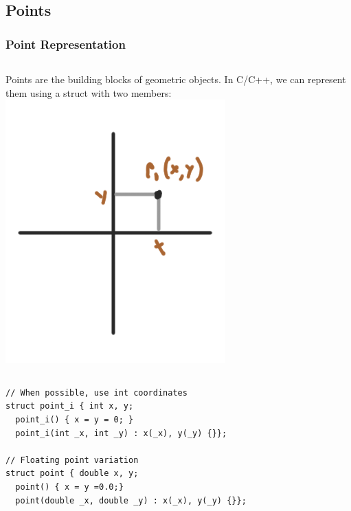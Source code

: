 \documentclass{beamer}
\begin{document}
\subsection{Points}
\begin{frame}
  \frametitle{Point Representation}  
  {\smaller

    \begin{columns}
      Points are the building blocks of geometric objects.
      In C/C++, we can represent them using a struct with two members:
      \includegraphics[width=.65\textwidth]{../img/geom2}
    \end{columns}

    \begin{exampleblock}{}
\begin{verbatim}
// When possible, use int coordinates
struct point_i { int x, y;
  point_i() { x = y = 0; }
  point_i(int _x, int _y) : x(_x), y(_y) {}};

// Floating point variation
struct point { double x, y;
  point() { x = y =0.0;}
  point(double _x, double _y) : x(_x), y(_y) {}};
\end{verbatim}
    \end{exampleblock}
  }
\end{frame}
\end{document}
